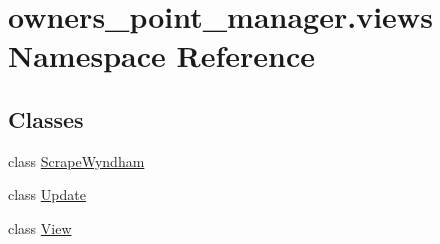 \hypertarget{namespaceowners__point__manager_1_1views}{\section{owners\-\_\-point\-\_\-manager.\-views Namespace Reference}
\label{namespaceowners__point__manager_1_1views}
}
\subsection*{Classes}
\begin{DoxyCompactItemize}
\item 
class \hyperlink{classowners__point__manager_1_1views_1_1ScrapeWyndham}{Scrape\-Wyndham}
\item 
class \hyperlink{classowners__point__manager_1_1views_1_1Update}{Update}
\item 
class \hyperlink{classowners__point__manager_1_1views_1_1View}{View}
\end{DoxyCompactItemize}
